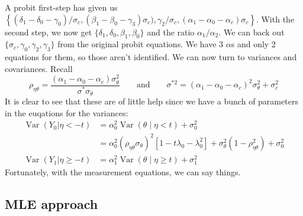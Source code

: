 \documentclass[11pt,letterpaper]{article}
\DeclareMathOperator{\Var}{Var}
\begin{document}
A probit first-step has given us $\left\{ (\delta_1 - \delta_0 -\gamma_0)/\sigma_c, (\beta_1 - \beta_0 - \gamma_3)\sigma_c), \gamma_2/\sigma_c, (\alpha_1 - \alpha_0 - \alpha_c)\sigma_c\right\}$. With the second step, we now get $\{\delta_1, \delta_0, \beta_1, \beta_0\}$ and the ratio $\alpha_1/\alpha_2$. We can back out $\{\sigma_c, \gamma_0, \gamma_2, \gamma_3\}$ from the original probit equations. We have 3 $\alpha$s and only 2 equations for them, so those aren't identified. We can now turn to variances and covariances. Recall
\[
\rho_{\eta\theta} = \frac{(\alpha_1 - \alpha_0 - \alpha_c)\sigma^2_\theta}{\sigma^{*}\sigma_\theta}
\qquad \text{and} \qquad
\sigma^{*2} = (\alpha_1 - \alpha_0 - \alpha_c)^2\sigma^2_\theta + \sigma^2_c
\]
It is clear to see that these are of little help since we have a bunch of parameters in the euqations for the variances: 
\begin{align*}
\Var (Y_0| \eta  <  -t ) 
	&= \alpha_0^2 \Var\left(\theta\middle| \eta <    t\right) + \sigma^2_0  \\
	&= \alpha_0^2 \left( \rho_{\eta\theta}\sigma_\theta \right)^2 \left[1 - t \lambda_0 - \lambda_0^2 \right] + \sigma^2_\theta \left( 1- \rho_{\eta\theta}^2\right) + \sigma^2_0\\
\Var (Y_1| \eta\geq -t ) &= \alpha_1^2 \Var\left(\theta\middle| \eta \geq t\right) + \sigma^2_1 
\end{align*}
Fortunately, with the measurement equations, we can say things.


\subsection{MLE approach}
\end{document}
